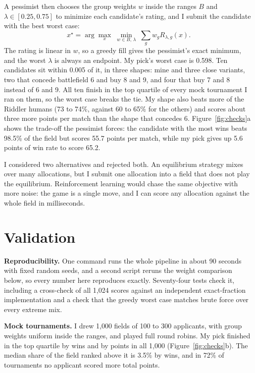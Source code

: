\documentclass[10pt,a4paper,twocolumn]{article}
\begin{document}
A pessimist then chooses the group weights $w$ inside the ranges $B$ and $\lambda \in [0.25, 0.75]$ to minimize each candidate's rating, and I submit the candidate with the best worst case:
\begin{equation*}
  x^\star = \arg\max_x \; \min_{w \in B,\, \lambda} \; \textstyle\sum_g w_g R_{\lambda,g}(x).
\end{equation*}
The rating is linear in $w$, so a greedy fill gives the pessimist's exact minimum, and the worst $\lambda$ is always an endpoint.
My pick's worst case is 0.598.
Ten candidates sit within 0.005 of it, in three shapes: mine and three close variants, two that concede battlefield 6 and buy 8 and 9, and four that buy 7 and 8 instead of 6 and 9.
All ten finish in the top quartile of every mock tournament I ran on them, so the worst case breaks the tie.
My shape also beats more of the Riddler humans (73 to 74\%, against 60 to 65\% for the others) and scores about three more points per match than the shape that concedes 6.
Figure~\ref{fig:checks}a shows the trade-off the pessimist forces: the candidate with the most wins beats 98.5\% of the field but scores 55.7 points per match, while my pick gives up 5.6 points of win rate to score 65.2.

I considered two alternatives and rejected both.
An equilibrium strategy mixes over many allocations, but I submit one allocation into a field that does not play the equilibrium.
Reinforcement learning would chase the same objective with more noise: the game is a single move, and I can score any allocation against the whole field in milliseconds.


\section{Validation}

\textbf{Reproducibility.}
One command runs the whole pipeline in about 90 seconds with fixed random seeds, and a second script reruns the weight comparison below, so every number here reproduces exactly.
Seventy-four tests check it, including a cross-check of all 1,024 scores against an independent exact-fraction implementation and a check that the greedy worst case matches brute force over every extreme mix.

\textbf{Mock tournaments.}
I drew 1,000 fields of 100 to 300 applicants, with group weights uniform inside the ranges, and played full round robins.
My pick finished in the top quartile by wins and by points in all 1,000 (Figure~\ref{fig:checks}b).
The median share of the field ranked above it is 3.5\% by wins, and in 72\% of tournaments no applicant scored more total points.
\end{document}
